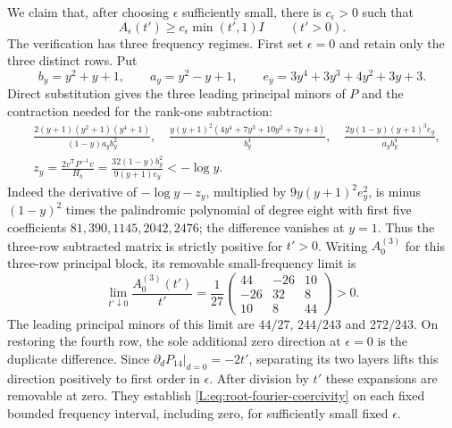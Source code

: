 We claim that, after choosing $\epsilon$ sufficiently small, there is
$c_\epsilon>0$ such that
\begin{equation}\label{L:eq:root-fourier-coercivity}
 A_\epsilon(t')\ge c_\epsilon\min(t',1)I
 \qquad(t'>0).
\end{equation}
The verification has three frequency regimes. First set $\epsilon=0$
and retain only the three distinct rows. Put
\[
 b_y=y^2+y+1,\qquad a_y=y^2-y+1,\qquad
 e_y=3y^4+3y^3+4y^2+3y+3.
\]
Direct substitution gives the three leading principal minors of $P$ and
the contraction needed for the rank-one subtraction:
\[
\begin{aligned}
 &\frac{2(y+1)(y^2+1)(y^4+1)}{(1-y)a_yb_y^2},
 \quad\frac{y(y+1)^2(4y^4+7y^3+10y^2+7y+4)}{b_y^4},
 \quad\frac{2y(1-y)(y+1)^3e_y}{a_yb_y^4},\\
 &z_y=\frac{2v^{\mathsf T}P^{-1}v}{H_b}
       =\frac{32(1-y)b_y^2}{9(y+1)e_y}< -\log y.
\end{aligned}
\]
Indeed the derivative of $-\log y-z_y$, multiplied by
$9y(y+1)^2e_y^2$, is minus $(1-y)^2$ times the palindromic polynomial of
degree eight with first five coefficients $81,390,1145,2042,2476$;
the difference vanishes at $y=1$. Thus the three-row subtracted matrix
is strictly positive for $t'>0$. Writing $A_0^{(3)}$ for this three-row principal block, its removable
small-frequency limit is
\[
 \lim_{t'\downarrow0}\frac{A_0^{(3)}(t')}{t'}
 =\frac1{27}\begin{pmatrix}
 44&-26&10\\-26&32&8\\10&8&44
 \end{pmatrix}>0.
\]
The leading principal minors of this limit are $44/27$, $244/243$ and
$272/243$. On restoring the fourth row, the sole additional zero direction
at $\epsilon=0$ is the duplicate difference. Since
$\partial_dP_{14}|_{d=0}=-2t'$, separating its two layers lifts this
direction positively to first order in $\epsilon$. After division by
$t'$ these expansions are removable at zero. They establish
\eqref{L:eq:root-fourier-coercivity} on each fixed bounded frequency
interval, including zero, for sufficiently small fixed $\epsilon$.

